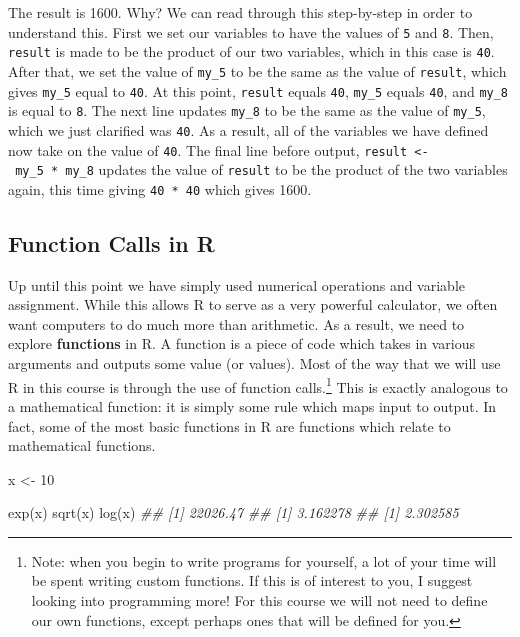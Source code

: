 \documentclass[
  letterpaper,
  DIV=11,
  numbers=noendperiod]{scrreprt}
\newenvironment{Shaded}{\begin{snugshade}}{\end{snugshade}}
\newcommand{\DecValTok}[1]{\textcolor[rgb]{0.68,0.00,0.00}{#1}}
\newcommand{\DocumentationTok}[1]{\textcolor[rgb]{0.37,0.37,0.37}{\textit{#1}}}
\newcommand{\FunctionTok}[1]{\textcolor[rgb]{0.28,0.35,0.67}{#1}}
\newcommand{\NormalTok}[1]{\textcolor[rgb]{0.00,0.23,0.31}{#1}}
\newcommand{\OtherTok}[1]{\textcolor[rgb]{0.00,0.23,0.31}{#1}}
\theoremstyle{definition}
\theoremstyle{definition}
\theoremstyle{definition}
\theoremstyle{remark}
\newcommand*\circled[1]{\tikz[baseline=(char.base)]{
          \node[shape=circle,draw,inner sep=1pt] (char) {{\scriptsize#1}};}}
\begin{document}
The result is 1600. Why? We can read through this step-by-step in order
to understand this. First we set our variables to have the values of
\texttt{5} and \texttt{8}. Then, \texttt{result} is made to be the
product of our two variables, which in this case is \texttt{40}. After
that, we set the value of \texttt{my\_5} to be the same as the value of
\texttt{result}, which gives \texttt{my\_5} equal to \texttt{40}. At
this point, \texttt{result} equals \texttt{40}, \texttt{my\_5} equals
\texttt{40}, and \texttt{my\_8} is equal to \texttt{8}. The next line
updates \texttt{my\_8} to be the same as the value of \texttt{my\_5},
which we just clarified was \texttt{40}. As a result, all of the
variables we have defined now take on the value of \texttt{40}. The
final line before output, \texttt{result\ \textless{}-\ my\_5\ *\ my\_8}
updates the value of \texttt{result} to be the product of the two
variables again, this time giving \texttt{40\ *\ 40} which gives 1600.

\subsection{Function Calls in R}\label{function-calls-in-r}

Up until this point we have simply used numerical operations and
variable assignment. While this allows R to serve as a very powerful
calculator, we often want computers to do much more than arithmetic. As
a result, we need to explore \textbf{functions} in R. A function is a
piece of code which takes in various arguments and outputs some value
(or values). Most of the way that we will use R in this course is
through the use of function calls.\footnote{Note: when you begin to
  write programs for yourself, a lot of your time will be spent writing
  custom functions. If this is of interest to you, I suggest looking
  into programming more! For this course we will not need to define our
  own functions, except perhaps ones that will be defined for you.} This
is exactly analogous to a mathematical function: it is simply some rule
which maps input to output. In fact, some of the most basic functions in
R are functions which relate to mathematical functions.

\label{annotated-cell-9}%
\begin{Shaded}
\begin{Highlighting}[]
\NormalTok{x }\OtherTok{\textless{}{-}} \DecValTok{10} 

\FunctionTok{exp}\NormalTok{(x) }\hspace*{\fill}\NormalTok{\circled{1}}
\FunctionTok{sqrt}\NormalTok{(x) }\hspace*{\fill}\NormalTok{\circled{2}}
\FunctionTok{log}\NormalTok{(x) }\hspace*{\fill}\NormalTok{\circled{3}}
\DocumentationTok{\#\# [1] 22026.47}
\DocumentationTok{\#\# [1] 3.162278}
\DocumentationTok{\#\# [1] 2.302585}
\end{Highlighting}
\end{Shaded}
\end{document}
